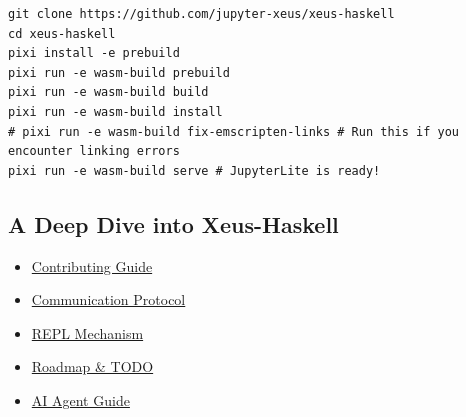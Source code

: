\begin{verbatim}
git clone https://github.com/jupyter-xeus/xeus-haskell
cd xeus-haskell
pixi install -e prebuild
pixi run -e wasm-build prebuild
pixi run -e wasm-build build
pixi run -e wasm-build install
# pixi run -e wasm-build fix-emscripten-links # Run this if you encounter linking errors
pixi run -e wasm-build serve # JupyterLite is ready!
\end{verbatim}


\subsection{A Deep Dive into Xeus-Haskell}


\begin{itemize}
\item \hyperref[sec:contributing]{Contributing Guide}
\item \hyperref[sec:communication]{Communication Protocol}
\item \hyperref[sec:repl]{REPL Mechanism}
\item \hyperref[sec:todo]{Roadmap \& TODO}
\item \href{https://github.com/jupyter-xeus/xeus-haskell/blob/main/AGENTS.md}{AI Agent Guide}
\end{itemize}
